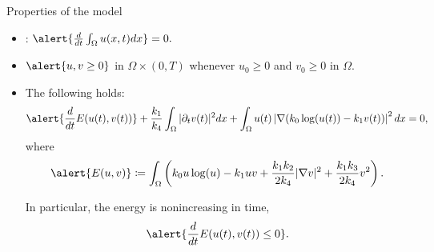 \begin{frame}{Properties of the model}
    \small
  \begin{itemize}
      \setlength{\itemsep}{1em}
      \item {}: $\alert{\frac{d}{dt}\int_\Omega u(x,t)dx}=0.$
      \item $\alert{u, v\ge 0}$ in $\Omega\times (0,T)$ whenever $u_0\ge 0$ and $v_0\ge0$ in $\Omega$.
      \item The following  holds:
      {\footnotesize
      \begin{align*}
      \alert{\frac{d }{dt}E(u(t),v(t))}+%
      \frac{k_1}{k_4}\int_\Omega |\partial_t v(t)|^2dx
      + \int_\Omega u(t)\left\vert\nabla(k_0\log(u(t))-k_1v(t))\right\vert^2 dx=0,
      \end{align*}
      }
      where
      $$
      \alert{E(u,v)}\coloneqq\int_\Omega \left(k_0u\log(u)-k_1uv+\frac{k_1k_2}{2k_4}\vert\nabla v\vert ^2+\frac{k_1k_3}{2k_4}v^2\right).
      $$

      In particular,  the energy is nonincreasing in time,
       $$\alert{\frac{d }{dt}E(u(t),v(t))\le 0}.$$
  \end{itemize}
\end{frame}

